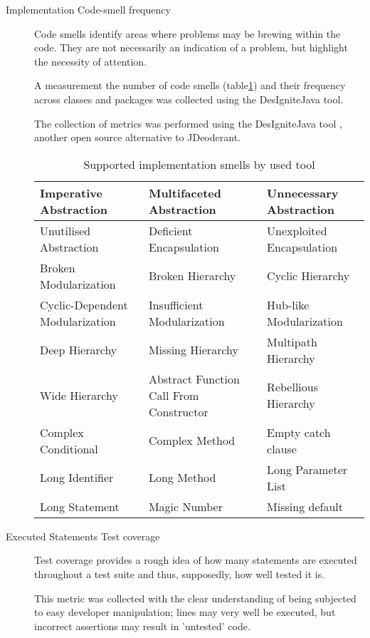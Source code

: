 \begin{description}
	\item [Implementation Code-smell frequency] Code smells identify areas where problems may be brewing within the code. They are not necessarily an indication of a problem, but highlight the necessity of attention. \parencite[chapter~3]{fowler1999refactoring}
	
	A measurement the number of code smells (table\ref{tab:supportedCodeSmells}) and their frequency across classes and packages was collected using the DesIgniteJava tool.
	
	The collection of metrics was performed using the DesIgniteJava tool \parencite{designiteToolGitHub}, another open source alternative to JDeoderant.
	
	\begin{table}[H]
		\begin{tabular}{ | l | l | l |}
			\hline
			Imperative Abstraction & Multifaceted Abstraction & Unnecessary Abstraction \\
			\hline
			Unutilised Abstraction & Deficient Encapsulation & Unexploited Encapsulation \\
			\hline
			Broken Modularization & Broken Hierarchy & Cyclic Hierarchy \\
			\hline
			Cyclic-Dependent Modularization & Insufficient Modularization & Hub-like Modularization \\
			\hline
			Deep Hierarchy & Missing Hierarchy & Multipath Hierarchy \\ 
			\hline
			Wide Hierarchy & Abstract Function Call From Constructor & Rebellious Hierarchy \\
			\hline
			Complex Conditional & Complex Method & Empty catch clause \\
			\hline
			Long Identifier & Long Method & Long Parameter List \\
			\hline
			Long Statement & Magic Number & Missing default \\
			\hline
		\end{tabular}
		\caption{Supported implementation smells by used tool}
		\label{tab:supportedCodeSmells}
	\end{table}
	
	\item [Executed Statements Test coverage] Test coverage provides a rough idea of how many statements are executed throughout a test suite and thus, supposedly, how well tested it is.
	
	This metric was collected with the clear understanding of being subjected to easy developer manipulation; lines may very well be executed, but incorrect assertions may result in 'untested' code.
	

\end{description}
